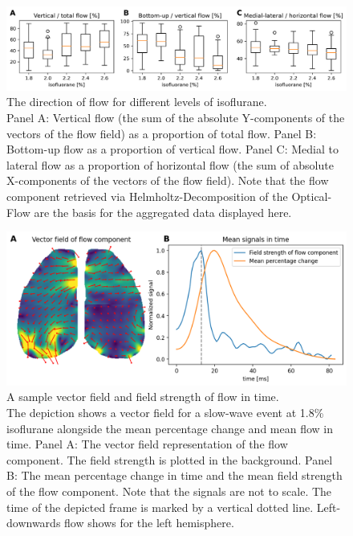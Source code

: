 \begin{figure}[!htb]
\centering
\includegraphics[width=\textwidth,height=\textheight,keepaspectratio]{Figures/direction_per_isoflourane}
\decoRule
\caption[Direction of flow for different levels of isoflurane]{The direction of flow for different levels of isoflurane.\\Panel A: Vertical flow (the sum of the absolute Y-components of the vectors of the flow field) as a proportion of total flow. Panel B: Bottom-up flow as a proportion of vertical flow. Panel C: Medial to lateral flow as a proportion of horizontal flow (the sum of absolute X-components of the vectors of the flow field). Note that the flow component retrieved via Helmholtz-Decomposition of the Optical-Flow are the basis for the aggregated data displayed here.}
\label{fig:direction_per_isoflourane}
\end{figure}

\begin{figure}[!htb]
\centering
\includegraphics[width=\textwidth,height=\textheight,keepaspectratio]{Figures/vector_field_flow_component}
\decoRule
\caption[A sample vector field and field strength of flow in time.]{A sample vector field and field strength of flow in time.\\ The depiction shows a vector field for a slow-wave event at 1.8\% isoflurane alongside the mean percentage change and mean flow in time. Panel A: The vector field representation of the flow component. The field strength is plotted in the background. Panel B: The mean percentage change in time and the mean field strength of the flow component. Note that the signals are not to scale. The time of the depicted frame is marked by a vertical dotted line. Left-downwards flow shows for the left hemisphere.}
\label{fig:vector_field_flow_component}
\end{figure}

